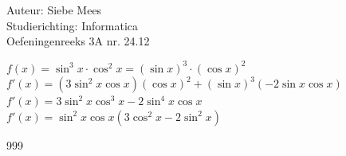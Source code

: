 \documentclass[a4paper]{article}
\begin{document}
  
\noindent \large Auteur: Siebe Mees \\
\noindent \large Studierichting: Informatica\\
\noindent \large Oefeningenreeks 3A nr. 24.12\\

\medskip

\normalsize

$f(x)=\sin^3 x\cdot \cos^2 x=(\sin x)^3\cdot (\cos x)^2$\\

$f'(x)=\left(3\sin^2 x\cos x\right)(\cos x)^2+(\sin x)^3\left(-2\sin x\cos x\right)$\\

$f'(x)=3\sin^2 x\cos^3 x-2\sin^4 x\cos x$\\

$f'(x)=\sin^2 x\cos x\left(3\cos^2 x-2\sin^2 x\right)$\\

\begin{thebibliography}{999}
\end{thebibliography}
\end{document}
